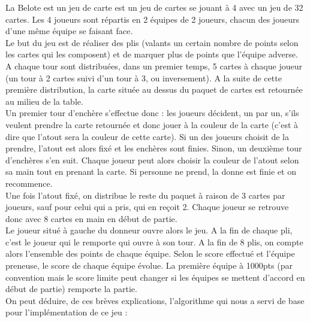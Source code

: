 \documentclass[a4paper]{report}
\begin{document}
La Belote est un jeu de carte est un jeu de cartes se jouant à 4 avec un jeu de 32 cartes. Les 4 joueurs sont répartis en 2 équipes de 2 joueurs, chacun des joueurs d'une même équipe se faisant face.\\
Le but du jeu est de réaliser des plis (valants un certain nombre de points selon les cartes qui les composent) et de marquer plus de points que l'équipe adverse.\\
A chaque tour sont distribuées, dans un premier temps, 5 cartes à chaque joueur (un tour à 2 cartes suivi d'un tour à 3, ou inversement). A la suite de cette première distribution, la carte située au dessus du paquet de cartes est retournée au milieu de la table.\\
Un premier tour d'enchère s'effectue donc : les joueurs décident, un par un, s'ils veulent prendre la carte retournée et donc jouer à la couleur de la carte (c'est à dire que l'atout sera la couleur de cette carte). Si un des joueurs choisit de la prendre, l'atout est alors fixé et les enchères sont finies. Sinon, un deuxième tour d'enchères s'en suit. Chaque joueur peut alors choisir la couleur de l'atout selon sa main tout en prenant la carte. Si personne ne prend, la donne est finie et on recommence.\\
Une fois l'atout fixé, on distribue le reste du paquet à raison de 3 cartes par joueurs, sauf pour celui qui a pris, qui en reçoit 2. Chaque joueur se retrouve donc avec 8 cartes en main en début de partie.\\
Le joueur situé à gauche du donneur ouvre alors le jeu. A la fin de chaque pli, c'est le joueur qui le remporte qui ouvre à son tour. A la fin de 8 plis, on compte alors l'ensemble des points de chaque équipe. Selon le score effectué et l'équipe preneuse, le score de chaque équipe évolue. La première équipe à 1000pts (par convention mais le score limite peut changer si les équipes se mettent d'accord en début de partie) remporte la partie.\\
On peut déduire, de ces brèves explications, l'algorithme qui nous a servi de base pour l'implémentation de ce jeu :\\
\end{document}

